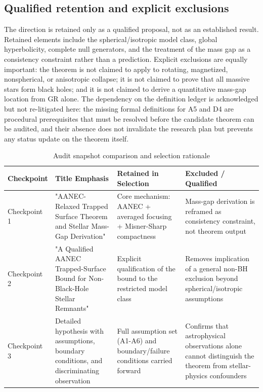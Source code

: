 \documentclass[conference]{IEEEtran}
\begin{document}
\subsection{Qualified retention and explicit exclusions}
The direction is retained only as a qualified proposal, not as an established result. Retained elements include the spherical/isotropic model class, global hyperbolicity, complete null generators, and the treatment of the mass gap as a consistency constraint rather than a prediction. Explicit exclusions are equally important: the theorem is not claimed to apply to rotating, magnetized, nonspherical, or anisotropic collapse; it is not claimed to prove that all massive stars form black holes; and it is not claimed to derive a quantitative mass-gap location from GR alone. The dependency on the definition ledger is acknowledged but not re-litigated here: the missing formal definitions for A5 and D4 are procedural prerequisites that must be resolved before the candidate theorem can be audited, and their absence does not invalidate the research plan but prevents any status update on the theorem itself.

\begin{table}[htbp]
\centering
\footnotesize
\setlength{\tabcolsep}{3pt}
\renewcommand{\arraystretch}{1.12}
\caption{Audit snapshot comparison and selection rationale}
\label{tab:idea-origin-and-selection-origin-4}
\begin{tabular}{|p{}|p{}|p{}|p{}|}
\hline
Checkpoint & Title Emphasis & Retained in Selection & Excluded / Qualified \\\hline
Checkpoint 1 & "AANEC-Relaxed Trapped Surface Theorem and Stellar Mass-Gap Derivation" & Core mechanism: AANEC + averaged focusing + Misner-Sharp compactness & Mass-gap derivation is reframed as consistency constraint, not theorem output \\\hline
Checkpoint 2 & "A Qualified AANEC Trapped-Surface Bound for Non-Black-Hole Stellar Remnants" & Explicit qualification of the bound to the restricted model class & Removes implication of a general non-BH exclusion beyond spherical/isotropic assumptions \\\hline
Checkpoint 3 & Detailed hypothesis with assumptions, boundary conditions, and discriminating observation & Full assumption set (A1-A6) and boundary/failure conditions carried forward & Confirms that astrophysical observations alone cannot distinguish the theorem from stellar-physics confounders \\\hline
\end{tabular}
\end{table}
\end{document}
